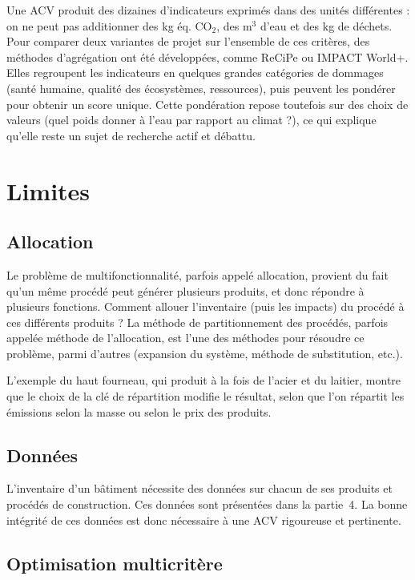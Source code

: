 Une ACV produit des dizaines d’indicateurs exprimés dans des unités différentes : on ne peut pas additionner des kg éq. CO$_2$, des m$^3$ d’eau et des kg de déchets. Pour comparer deux variantes de projet sur l’ensemble de ces critères, des méthodes d’agrégation ont été développées, comme ReCiPe ou IMPACT World+. Elles regroupent les indicateurs en quelques grandes catégories de dommages (santé humaine, qualité des écosystèmes, ressources), puis peuvent les pondérer pour obtenir un score unique. Cette pondération repose toutefois sur des choix de valeurs (quel poids donner à l’eau par rapport au climat ?), ce qui explique qu’elle reste un sujet de recherche actif et débattu.

\section{Limites}

\subsection*{Allocation}

Le problème de multifonctionnalité, parfois appelé allocation, provient du fait qu'un même procédé peut générer plusieurs produits, et donc répondre à plusieurs fonctions. Comment allouer l'inventaire (puis les impacts) du procédé à ces différents produits ? La méthode de partitionnement des procédés, parfois appelée méthode de l'allocation, est l'une des méthodes pour résoudre ce problème, parmi d'autres (expansion du système, méthode de substitution, etc.).

L'exemple du haut fourneau, qui produit à la fois de l'acier et du laitier, montre que le choix de la clé de répartition modifie le résultat, selon que l'on répartit les émissions selon la masse ou selon le prix des produits.

\subsection*{Données}

L'inventaire d'un bâtiment nécessite des données sur chacun de ses produits et procédés de construction. Ces données sont présentées dans la partie~4. La bonne intégrité de ces données est donc nécessaire à une ACV rigoureuse et pertinente.

\subsection*{Optimisation multicritère}

